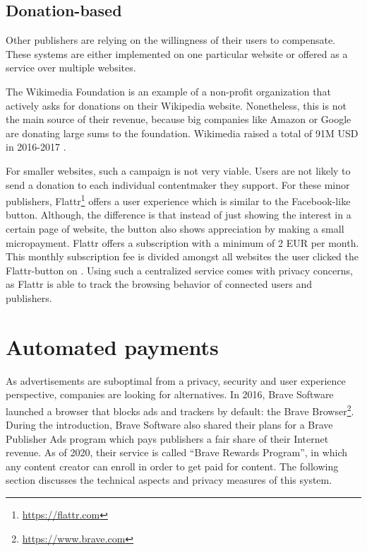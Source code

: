 \subsection{Donation-based}

Other publishers are relying on the willingness of their users to compensate. These systems are either implemented on one particular website or offered as a service over multiple websites.

The Wikimedia Foundation is an example of a non-profit organization that actively asks for donations on their Wikipedia website. Nonetheless, this is not the main source of their revenue, because big companies like Amazon or Google are donating large sums to the foundation. Wikimedia raised a total of 91M USD in 2016-2017 \cite{wikimediadonation}.

For smaller websites, such a campaign is not very viable. Users are not likely to send a donation to each individual contentmaker they support. For these minor publishers, Flattr\footnote{\url{https://flattr.com}} offers a user experience which is similar to the Facebook-like button. Although, the difference is that instead of just showing the interest in a certain page of website, the button also shows appreciation by making a small micropayment. Flattr offers a subscription with a minimum of 2 EUR per month. This monthly subscription fee is divided amongst all websites the user clicked the Flattr-button on \cite{loll2010flattr}. Using such a centralized service comes with privacy concerns, as Flattr is able to track the browsing behavior of connected users and publishers.

\section{Automated payments}
As advertisements are suboptimal from a privacy, security and user experience perspective, companies are looking for alternatives. In 2016, Brave Software launched a browser that blocks ads and trackers by default: the Brave Browser\footnote{\url{https://www.brave.com}}. During the introduction, Brave Software also shared their plans for a Brave Publisher Ads program which pays publishers a fair share of their Internet revenue. As of 2020, their service is called ``Brave Rewards Program'', in which any content creator can enroll in order to get paid for content. The following section discusses the technical aspects and privacy measures of this system.

